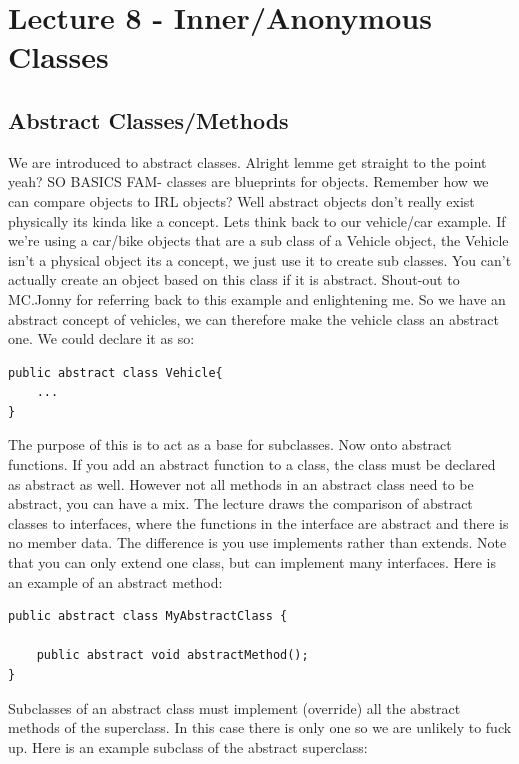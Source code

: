 \documentclass{article}
\begin{document}
\section{Lecture 8 - Inner/Anonymous Classes}

\subsection{Abstract Classes/Methods}

We are introduced to abstract classes. Alright lemme get straight to the point yeah? SO BASICS FAM- classes
are blueprints for objects. Remember how we can compare objects to IRL objects? Well abstract objects
don't really exist physically its kinda like a concept. Lets think back to our vehicle/car example. If we're
using a car/bike objects that are a sub class of a Vehicle object, the Vehicle isn't a physical object its a 
concept, we just use it to create sub classes. You can't actually create an object based on this class if it
is abstract. Shout-out to MC.Jonny for referring back to this example and enlightening me. So we have an 
abstract concept of vehicles, we can therefore make the vehicle class an abstract one. We could declare it as so:

\begin{lstlisting}
public abstract class Vehicle{
	...
}
\end{lstlisting} 

The purpose of this is to act as a base for subclasses. Now onto abstract functions. If you add an abstract
function to a class, the class must be declared as abstract as well. However not all methods in an abstract
class need to be abstract, you can have a mix. The lecture draws the comparison of abstract classes to interfaces, 
where the functions in the interface are abstract and there is no member data. The difference is you use implements
rather than extends. Note that you can only extend one class, but can implement many interfaces. Here is an 
example of an abstract method:

\begin{lstlisting}
public abstract class MyAbstractClass {

    public abstract void abstractMethod();
}
\end{lstlisting}

Subclasses of an abstract class must implement (override) all the abstract methods of the superclass. In this case
there is only one so we are unlikely to fuck up. Here is an example subclass of the abstract superclass:
\end{document}
